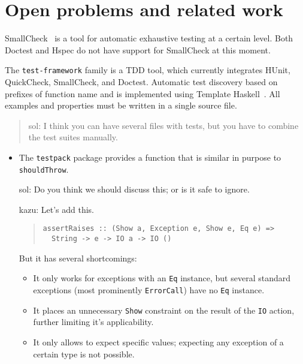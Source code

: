 \documentclass[preprint]{sigplanconf}
\begin{document}
\section{Open problems and related work}

SmallCheck~\cite{smallcheck} is a tool for
automatic exhaustive testing at a certain level.
Both Doctest and Hspec do not have support for SmallCheck
at this moment.

The {\tt test-framework} family is a TDD tool,
which currently integrates HUnit, QuickCheck, SmallCheck, and Doctest.
Automatic test discovery based on prefixes of function name
and is implemented using Template Haskell~\cite{template-haskell}.
All examples and properties must be written in a single
source file.

\begin{quote}
    sol: I think you can have several files with tests, but you have
    to combine the test suites manually.
\end{quote}


\begin{itemize}
    \item The {\tt testpack} package provides a function that is
        similar in purpose to {\tt shouldThrow}.

        sol: Do you think we should discuss this; or is it safe to
        ignore.

        kazu: Let's add this.

\begin{quote}\small\begin{verbatim}
assertRaises :: (Show a, Exception e, Show e, Eq e) =>
  String -> e -> IO a -> IO ()
\end{verbatim}\end{quote}
        But it has several shortcomings:
        \begin{itemize}
            \item
                It only works for exceptions with an {\tt Eq}
                instance, but several standard exceptions (most
                prominently {\tt ErrorCall}) have no {\tt Eq}
                instance.
            \item
                It places an unnecessary {\tt Show} constraint on the
                result of the {\tt IO} action, further limiting it's
                applicability.
            \item
                It only allows to expect specific values; expecting
                any exception of a certain type is not possible.
        \end{itemize}
\end{itemize}
\end{document}
